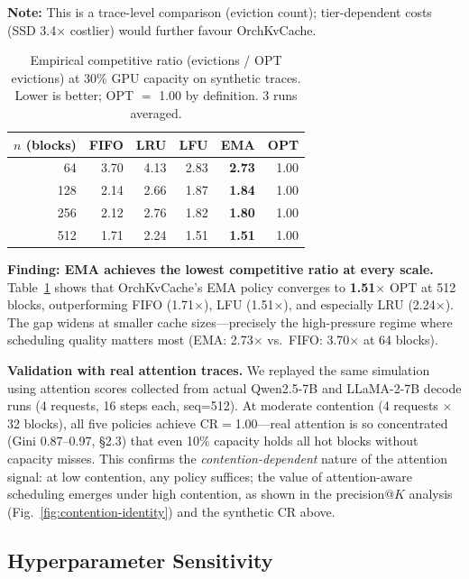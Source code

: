 \documentclass[conference]{IEEEtran}
\begin{document}
\textbf{Note:} This is a trace-level comparison (eviction count); tier-dependent costs (SSD 3.4$\times$ costlier) would further favour OrchKvCache.

\begin{table}[t]
\centering
\caption{Empirical competitive ratio (evictions / OPT evictions) at 30\% GPU capacity on synthetic traces. Lower is better; OPT $=$ 1.00 by definition. 3 runs averaged.}
\label{tab:cr}
\small
\begin{tabular}{@{}rrrrrr@{}}
\toprule
$n$ (blocks) & FIFO & LRU & LFU & \textbf{EMA} & OPT \\
\midrule
64  & 3.70 & 4.13 & 2.83 & \textbf{2.73} & 1.00 \\
128 & 2.14 & 2.66 & 1.87 & \textbf{1.84} & 1.00 \\
256 & 2.12 & 2.76 & 1.82 & \textbf{1.80} & 1.00 \\
512 & 1.71 & 2.24 & 1.51 & \textbf{1.51} & 1.00 \\
\bottomrule
\end{tabular}
\end{table}

\textbf{Finding: EMA achieves the lowest competitive ratio at every scale.} Table~\ref{tab:cr} shows that OrchKvCache's EMA policy converges to \textbf{1.51$\times$} OPT at 512 blocks, outperforming FIFO (1.71$\times$), LFU (1.51$\times$), and especially LRU (2.24$\times$). The gap widens at smaller cache sizes---precisely the high-pressure regime where scheduling quality matters most (EMA: 2.73$\times$ vs.\ FIFO: 3.70$\times$ at 64 blocks).

\textbf{Validation with real attention traces.} We replayed the same simulation using attention scores collected from actual Qwen2.5-7B and LLaMA-2-7B decode runs (4 requests, 16 steps each, seq=512). At moderate contention (4 requests $\times$ 32 blocks), all five policies achieve CR$=$1.00---real attention is so concentrated (Gini 0.87--0.97, \S2.3) that even 10\% capacity holds all hot blocks without capacity misses. This confirms the \emph{contention-dependent} nature of the attention signal: at low contention, any policy suffices; the value of attention-aware scheduling emerges under high contention, as shown in the precision@$K$ analysis (Fig.~\ref{fig:contention-identity}) and the synthetic CR above.

\subsection{Hyperparameter Sensitivity}
\label{sec:hyperparam}
\end{document}
